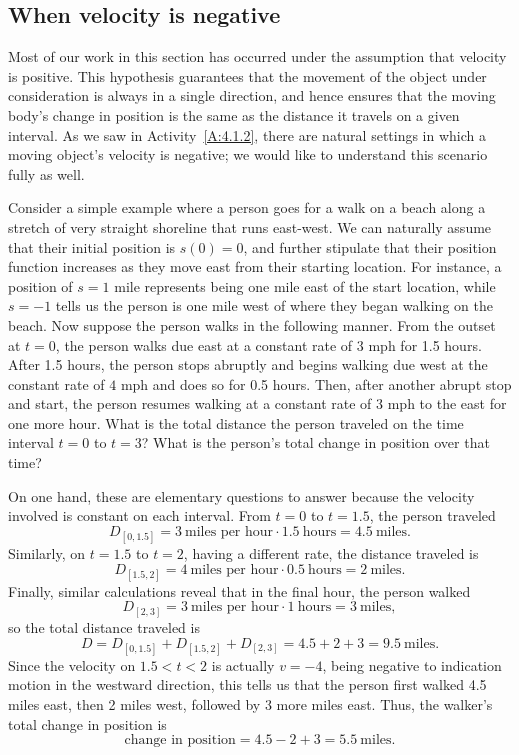 \subsection*{When velocity is negative}

Most of our work in this section has occurred under the assumption that velocity is positive.  This hypothesis guarantees that the movement of the object under consideration is always in a single direction, and hence ensures that the moving body's change in position is the same as the distance it travels on a given interval.  As we saw in Activity~\ref{A:4.1.2}, there are natural settings in which a moving object's velocity is negative; we would like to understand this scenario fully as well.

Consider a simple example where a person goes for a walk on a beach along a stretch of very straight shoreline that runs east-west.  We can naturally assume that their initial position is $s(0) = 0$, and further stipulate that their position function increases as they move east from their starting location.  For instance, a position of $s = 1$ mile represents being one mile east of the start location, while $s = -1$ tells us the person is one mile west of where they began walking on the beach.  Now suppose the person walks in the following manner.  From the outset at $t = 0$, the person walks due east at a constant rate of $3$ mph for 1.5 hours.  After 1.5 hours, the person stops abruptly and begins walking due west at the constant rate of $4$ mph and does so for 0.5 hours.  Then, after another abrupt stop and start, the person resumes walking at a constant rate of $3$ mph to the east for one more hour.  What is the total distance the person traveled on the time interval $t = 0$ to $t = 3$?  What is the person's total change in position over that time?

On one hand, these are elementary questions to answer because the velocity involved is constant on each interval.  From $t = 0$ to $t = 1.5$, the person traveled $$D_{[0,1.5]} = 3 \ \mbox{miles per hour} \cdot 1.5 \ \mbox{hours} = 4.5 \ \mbox{miles}.$$  Similarly, on $t = 1.5$ to $t = 2$, having a different rate, the distance traveled is
$$D_{[1.5,2]} = 4 \ \mbox{miles per hour} \cdot 0.5 \ \mbox{hours} = 2 \ \mbox{miles}.$$
Finally, similar calculations reveal that in the final hour, the person walked
$$D_{[2,3]} = 3 \ \mbox{miles per hour} \cdot 1 \ \mbox{hours} = 3 \ \mbox{miles},$$
so the total distance traveled is
$$D = D_{[0,1.5]} + D_{[1.5,2]} + D_{[2,3]} = 4.5 + 2 + 3 = 9.5 \ \mbox{miles}.$$
Since the velocity on $1.5 < t < 2$ is actually $v = -4$, being negative to indication motion in the westward direction, this tells us that the person first walked 4.5 miles east, then 2 miles west, followed by 3 more miles east.  Thus, the walker's total change in position is
$$\mbox{change in position} = 4.5 - 2 + 3 = 5.5 \ \mbox{miles}.$$

